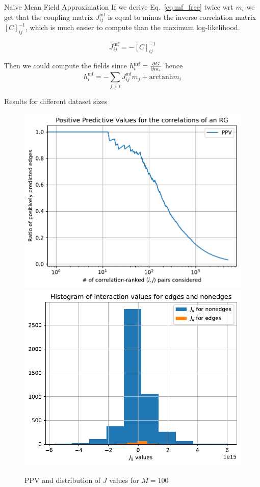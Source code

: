 \documentclass[handout]{beamer}
\newcommand{\arctanh}{\text{arctanh}}
\begin{document}
\begin{frame}{Naive Mean Field Approximation}
    If we derive Eq.~\ref{eq:mf_free} twice wrt $m_i$ we get that the coupling
    matrix $J^{\text{mf}}_{ij}$ is equal to minus the inverse correlation matrix
    $[C]_{ij}^{-1}$, which is much easier to compute than the maximum
    log-likelihood.

    \begin{equation}
        J^{\text{mf}}_{ij} = - [C]_{ij}^{-1}
    \end{equation}

    Then we could compute the fields since $h_i^{\text{mf}}=\pdv{G}{m_i}$ hence
    \begin{equation}
    h_i^{\text{mf}} = -\sum_{j\neq i} J_{ij}^{\text{mf}} m_j + \arctanh{m_i}
    \end{equation}
    \cite[17]{inverse}
\end{frame}

\begin{frame}{Results for different dataset sizes}
    \begin{figure}
        \centering
        \includegraphics[width=.45\textwidth]{ppv_1h}
        \includegraphics[width=.45\textwidth]{nmf_jhist_1h}
        \caption{PPV and distribution of $J$ values for $M=100$}
        \label{fig:nmf_1h}
    \end{figure}
\end{frame}
\end{document}
